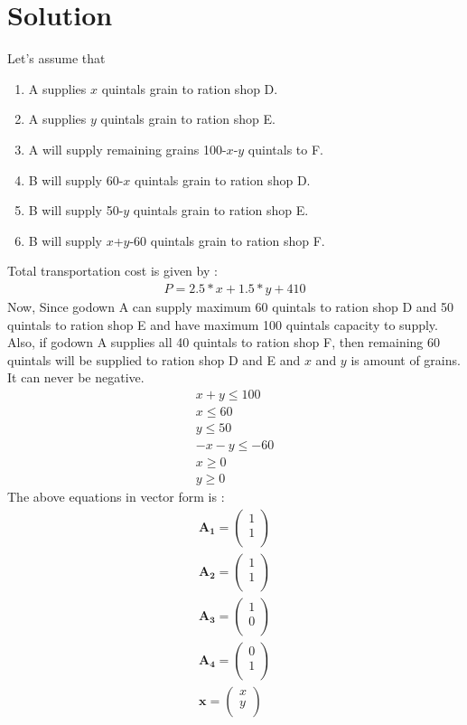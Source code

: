 \documentclass[journal,10pt,twocolumn]{article}
\let\vec\mathbf
\begin{document}
\section*{Solution}
Let's assume that \\
\begin{enumerate}
\item A supplies $x$ quintals grain to ration shop D.
\item A supplies $y$ quintals grain to ration shop E.
\item A will supply remaining grains 100-$x$-$y$ quintals to F.
\item B will supply 60-$x$ quintals grain to ration shop D. 
\item B will supply 50-$y$ quintals grain to ration shop E.
\item B will supply $x$+$y$-60 quintals grain to ration shop F.
\end{enumerate}
Total transportation cost is given by :
\begin{align}
P=2.5*x+1.5*y+410
\end{align}
Now, Since godown A can supply maximum 60 quintals to ration shop D and 50 quintals to ration shop E and have maximum 100 quintals capacity to supply.\vspace{2mm} \\ Also, if godown A supplies all 40 quintals to ration shop F, then remaining 60 quintals will be supplied to ration shop D and E and $x$ and $y$ is amount of grains. It can never be negative.
\begin{align}
x+y \le 100 \\
x \le 60 \\
y \le 50 \\
-x-y \le -60 \\
x \ge 0 \\
y \ge 0
\end{align}
The above equations in vector form is :
\begin{align}
\vec{A_1} = 
\begin{pmatrix}
1 \\
1 \\
\end{pmatrix} \\
\vec{A_2} = 
\begin{pmatrix}
1 \\
1 \\
\end{pmatrix} \\
\vec{A_3} = 
\begin{pmatrix}
1 \\
0 \\
\end{pmatrix} \\
\vec{A_4} = 
\begin{pmatrix}
0 \\
1 \\
\end{pmatrix} \\
\vec{x} = 
\begin{pmatrix}
x \\
y \\
\end{pmatrix}
\end{align}
\end{document}
